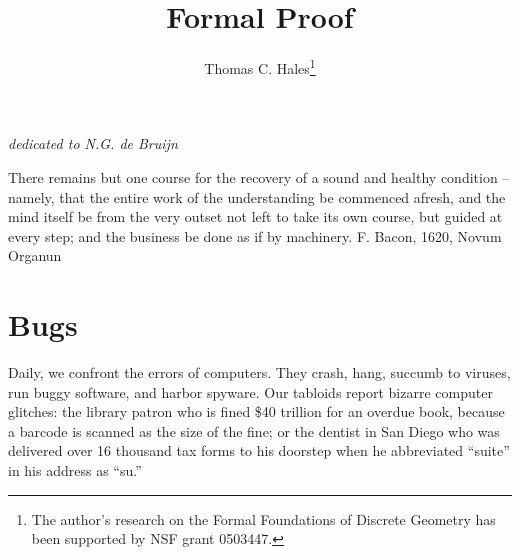 \documentclass{llncs}
\begin{document}
\title{Formal Proof}%
\author{Thomas C. Hales\thanks{The author's research on the Formal Foundations of Discrete Geometry has been supported by NSF grant 0503447.}}
\maketitle


\centerline{\it dedicated to N.G. de Bruijn}


\bigskip

{\narrower\it 

There remains but one course 
for the recovery of a sound and healthy condition --
namely, that the entire work of the understanding be commenced afresh, and the mind itself be from the very outset not left to take its own course, but
guided at every step; and the business be done
as if by machinery.  F. Bacon, 1620, Novum Organun

}

\bigskip



\bigskip

\section{Bugs}

Daily, we confront the errors of computers.  They crash,
hang, succumb to viruses, run buggy software, and harbor
spyware.  Our  tabloids report bizarre computer glitches:
the library patron who is fined \$40 trillion for an overdue
book, because a  
barcode is scanned as the size of the fine; or the 
dentist in San Diego who was delivered over 16 thousand tax forms
to his doorstep when he abbreviated ``suite'' 
in his address as ``su.''
\end{document}
